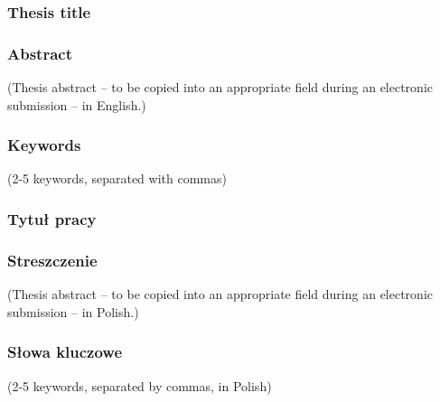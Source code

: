 \subsubsection*{Thesis title} \Title

\subsubsection*{Abstract}
(Thesis abstract – to be copied into an appropriate field during an electronic submission – in English.)

\subsubsection*{Keywords}
(2-5 keywords, separated with commas)

\subsubsection*{Tytuł pracy}
\begin{otherlanguage}{polish}
\TitleAlt
\end{otherlanguage}

\subsubsection*{Streszczenie}
\begin{otherlanguage}{polish}
(Thesis abstract – to be copied into an appropriate field during an electronic submission – in Polish.)
\end{otherlanguage}
\subsubsection*{Słowa kluczowe}
\begin{otherlanguage}{polish}
(2-5 keywords, separated by commas, in Polish)
\end{otherlanguage}

